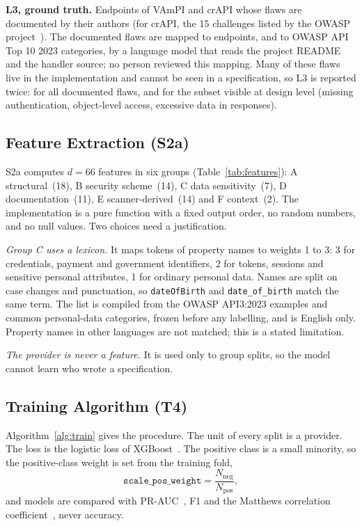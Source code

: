 \documentclass[conference]{IEEEtran}
\begin{document}
\textbf{L3, ground truth.} Endpoints of VAmPI and crAPI whose flaws are documented by their
authors (for crAPI, the 15 challenges listed by the OWASP project~\cite{crapichallenges}). The documented flaws are mapped to endpoints, and to OWASP API Top 10 2023 categories, by a language model that reads the project README and the handler source; no person reviewed this mapping. Many of these flaws live in the implementation and cannot be seen in a specification,
so L3 is reported twice: for all documented flaws, and for the subset visible at design level
(missing authentication, object-level access, excessive data in responses).

\subsection{Feature Extraction (S2a)}
\label{sec:m-feat}
S2a computes $d=66$ features in six groups (Table~\ref{tab:features}): A structural~(18),
B security scheme~(14), C data sensitivity~(7), D documentation~(11), E scanner-derived~(14)
and F context~(2). The implementation is a pure function with a fixed output order, no random
numbers, and no null values. Two choices need a justification.

\emph{Group C uses a lexicon.} It maps tokens of property names to weights 1 to 3: 3 for
credentials, payment and government identifiers, 2 for tokens, sessions and sensitive personal
attributes, 1 for ordinary personal data. Names are split on case changes and punctuation, so
\texttt{dateOfBirth} and \texttt{date\_of\_birth} match the same term. The list is compiled
from the OWASP API3:2023 examples and common personal-data categories, frozen before any
labelling, and is English only. Property names in other languages are not matched; this is a
stated limitation.

\emph{The provider is never a feature.} It is used only to group splits, so the model cannot
learn who wrote a specification.

\subsection{Training Algorithm (T4)}
Algorithm~\ref{alg:train} gives the procedure. The unit of every split is a provider. The
loss is the logistic loss of XGBoost~\cite{xgboost}. The positive class is a small minority,
so the positive-class weight is set from the training fold,
\begin{equation}
\texttt{scale\_pos\_weight}=\frac{N_{\text{neg}}}{N_{\text{pos}}},
\end{equation}
and models are compared with PR-AUC~\cite{saito}, F1 and the Matthews correlation
coefficient~\cite{chicco}, never accuracy.
\end{document}
